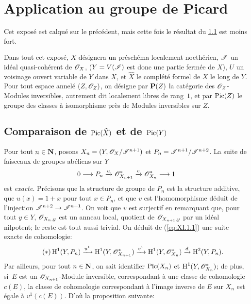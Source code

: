 \chapter{Application au groupe de Picard} \label{XI}

Cet expos\'e est calqu\'e sur le pr\'ec\'edent, mais cette fois le r\'esultat du \numero \ref{XI.1} est moins fort.

Dans tout cet expos\'e, $X$ d\'esignera un pr\'esch\'ema localement noeth\'erien, ${\mathscr I}$ un id\'eal quasi-coh\'erent de $\mathscr{O}_X$, ($Y=V({\mathscr I})$ est donc une partie ferm\'ee de $X$), $U$ un voisinage ouvert variable de $Y$ dans $X$, et $\hat X$ le compl\'et\'e formel de $X$ le long de $Y$. Pour tout espace annel\'e $(Z, {\mathscr O}_Z)$, on d\'esigne par ${\mathbf P}(Z)$\label{pXI.1} la cat\'egorie des ${\mathscr O}_Z$-Modules inversibles, autrement dit localement libres de rang~$1$, et par $\operatorname{Pic}(Z)$ le groupe des classes \`a isomorphisme pr\`es de Modules inversibles sur $Z$.

\section{Comparaison de $\operatorname{Pic}(\widehat X)$ et de $\operatorname{Pic}(Y)$} \label{XI.1}

Pour tout $n\in\mathbf{N}$, posons $X_n = (Y, \mathscr{O}_X/{\mathscr I}^{n+1})$ et $P_n = {\mathscr I}^{n+1}/{\mathscr I}^{n+2}$. La suite de faisceaux de groupes ab\'eliens sur $Y$
\begin{equation} \label{eq:XI.1.1} 0\to P_n\lto{u}\Oo_{X_{n+1}}^*\lto{v}\Oo_{X_n}^*\to 1
\end{equation}
est \emph{exacte}. Pr\'ecisons que la structure de groupe de $P_n$ est la structure additive, que $u(x)=1+x$ pour tout $x\in P_n$, et que $v$ est l'homomorphisme d\'eduit de l'injection $\Ii^{n+2}\to\Ii^{n+1}$. On voit que $v$ est surjectif en remarquant que, pour tout $y \in Y$, ${\mathscr O}_{X_n, y}$ est un anneau local, quotient de ${\mathscr O}_{X_{n+1}, y}$ par un id\'eal nilpotent; le reste est tout aussi trivial. On d\'eduit de (\ref{eq:XI.1.1}) une suite exacte de cohomologie:
\begin{equation*} \label{eq:XI.1.*} \tag{$*$}
\operatorname{H}^1(Y, P_n)\xrightarrow{u^1}\operatorname{H}^1(Y, {\mathscr O}_{X_{n+1}}^*)\xrightarrow{v^1} \operatorname{H}^1(Y, {\mathscr O}_{X_n}^*)\xrightarrow{d}\operatorname{H}^2(Y, P_n){}.
\end{equation*}
Par ailleurs, pour tout $n\in\mathbf{N}$, on sait identifier $\operatorname{Pic}(X_n)$ et $\operatorname{H}^1(Y, {\mathscr O}_{X_n}^*)$; de plus, si~$E$ est un ${\mathscr O}_{X_{n+1}}$-Module inversible, correspondant \`a une classe de cohomologie $c(E)$, la classe de cohomologie correspondant \`a l'image inverse de $E$ sur $X_n$ est \'egale \`a $v^1(c(E))$. D'o\`u la proposition suivante:

